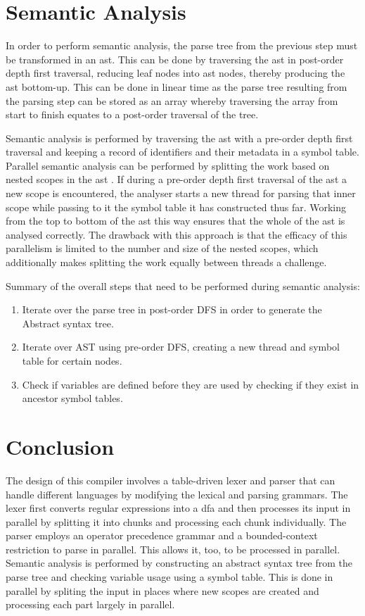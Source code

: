 \section{Semantic Analysis} \label{design_analyser}

In order to perform semantic analysis, the parse tree from the previous
step must be transformed in an \gls{ast}. This can be done by traversing the
\gls{ast} in post-order depth first traversal, reducing leaf nodes into ast nodes,
thereby producing the \gls{ast} bottom-up. This can be done in linear time as
the parse tree resulting from the parsing step can be stored as an array whereby
traversing the array from start to finish equates to a post-order traversal of
the tree. 

Semantic analysis is performed by traversing the \gls{ast} with a
pre-order depth first traversal and keeping a record of identifiers
and their metadata in a symbol table. Parallel semantic analysis can be
performed by splitting the work based on nested scopes in the \gls{ast}
\citep{seshadri_investigation_1991}. If during a pre-order depth first traversal
of the \gls{ast} a new scope is encountered, the analyser starts a new thread
for parsing that inner scope while passing to it the symbol table it has
constructed thus far. Working from the top to bottom of the \gls{ast} this way
ensures that the whole of the \gls{ast} is analysed correctly. The drawback with
this approach is that the efficacy of this parallelism is limited to the number
and size of the nested scopes, which additionally makes splitting the work
equally between threads a challenge.

Summary of the overall steps that need to be performed during semantic
analysis:

\begin{enumerate}
	\item Iterate over the parse tree in post-order DFS in order to generate the Abstract syntax tree.
	\item Iterate over AST using pre-order DFS, creating a new thread and symbol table for certain nodes.
	\item Check if variables are defined before they are used by checking if they exist in ancestor symbol tables.
\end{enumerate}

\section{Conclusion}

The design of this compiler involves a table-driven lexer and parser that can handle different languages by modifying the lexical and parsing grammars. The lexer first converts regular expressions into a \gls{dfa} and then processes its input in parallel by splitting it into chunks and processing each chunk individually. The parser employs an operator precedence grammar and a bounded-context restriction to parse in parallel. This allows it, too, to be processed in parallel. Semantic analysis is performed by constructing an abstract syntax tree from the parse tree and checking variable usage using a symbol table. This is done in parallel by spliting the input in places where new scopes are created and processing each part largely in parallel.
